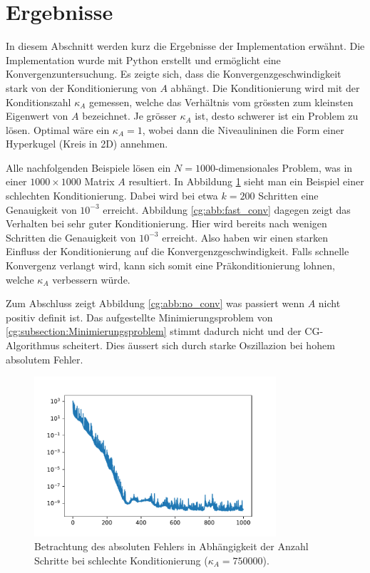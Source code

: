 \section{Ergebnisse}
\label{cg:section:ergebnisse}

In diesem Abschnitt werden kurz die Ergebnisse der Implementation erwähnt.
Die Implementation wurde mit Python erstellt und ermöglicht eine Konvergenzuntersuchung.
Es zeigte sich, dass die Konvergenzgeschwindigkeit stark von der Konditionierung von $A$ abhängt.
Die Konditionierung wird mit der Konditionszahl $\kappa_A$ gemessen, welche das Verhältnis vom grössten zum kleinsten Eigenwert von $A$ bezeichnet.
Je grösser $\kappa_A$ ist, desto schwerer ist ein Problem zu lösen.
Optimal wäre ein $\kappa_A = 1$, wobei dann die Niveaulininen die Form einer Hyperkugel (Kreis in 2D) annehmen.

Alle nachfolgenden Beispiele lösen ein $N=1000$-dimensionales Problem, was in einer $1000 \times 1000$ Matrix $A$ resultiert.
In Abbildung \ref{cg:abb:slow_conv} sieht man ein Beispiel einer schlechten Konditionierung.
Dabei wird bei etwa $k=200$ Schritten eine Genauigkeit von $10^{-3}$ erreicht.
Abbildung \ref{cg:abb:fast_conv} dagegen zeigt das Verhalten bei sehr guter Konditionierung.
Hier wird bereits nach wenigen Schritten die Genauigkeit von $10^{-3}$ erreicht.
Also haben wir einen starken Einfluss der Konditionierung auf die Konvergenzgeschwindigkeit.
Falls schnelle Konvergenz verlangt wird, kann sich somit eine Präkonditionierung lohnen, welche $\kappa_A$ verbessern würde.

Zum Abschluss zeigt Abbildung \ref{cg:abb:no_conv} was passiert wenn $A$ nicht positiv definit ist.
Das aufgestellte Minimierungsproblem von \ref{cg:subsection:Minimierungsproblem} stimmt dadurch nicht und der CG-Algorithmus scheitert.
Dies äussert sich durch starke Oszillazion bei hohem absolutem Fehler.

\begin{figure}	
	\centering
	\includegraphics[width=0.8\textwidth]{papers/cg/images/convergence_k_750000}
	\caption{Betrachtung des absoluten Fehlers in Abhängigkeit der Anzahl Schritte bei schlechte Konditionierung ($\kappa_A=750000$).}
	\label{cg:abb:slow_conv}
\end{figure}

